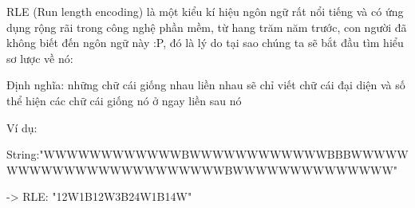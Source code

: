 RLE (Run length encoding) là một kiểu kí hiệu ngôn ngữ rất nổi tiếng và có ứng dụng rộng rãi trong công nghệ phần mềm, từ hang trăm năm trước, con người đã không biết đến ngôn ngữ này :P, đó là lý do tại sao chúng ta sẽ bắt đầu tìm hiểu sơ lược về nó:

Định nghĩa: những chữ cái giống nhau liền nhau sẽ chỉ viết chữ cái đại diện và số thể hiện các chữ cái giống nó ở ngay liền sau nó

Ví dụ:

String:"WWWWWWWWWWWWBWWWWWWWWWWWWBBBWWWWWWWWWWWWWWWWWWWWWWWWBWWWWWWWWWWWWWW" \textbf{}

-> RLE: "12W1B12W3B24W1B14W"